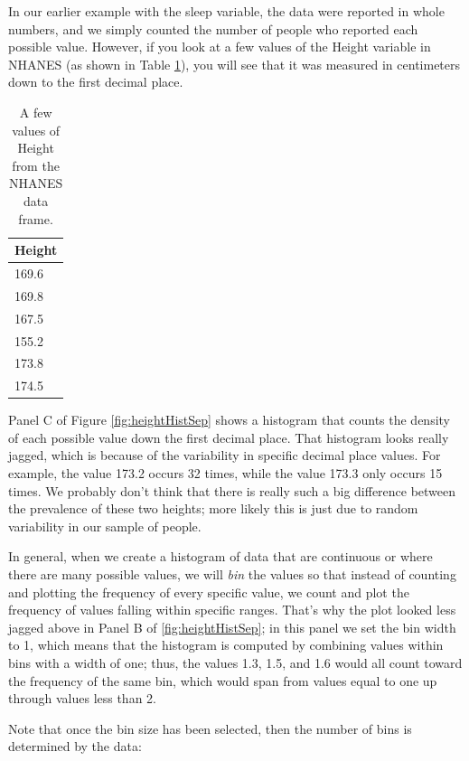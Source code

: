 \documentclass[
  12pt,
]{book}
\begin{document}
In our earlier example with the sleep variable, the data were reported in whole numbers, and we simply counted the number of people who reported each possible value. However, if you look at a few values of the Height variable in NHANES (as shown in Table \ref{tab:heightVals}), you will see that it was measured in centimeters down to the first decimal place.

\begin{table}

\caption{\label{tab:heightVals}A few values of Height from the NHANES data frame.}
\centering
\begin{tabular}[t]{l}
\hline
Height\\
\hline
169.6\\
\hline
169.8\\
\hline
167.5\\
\hline
155.2\\
\hline
173.8\\
\hline
174.5\\
\hline
\end{tabular}
\end{table}

Panel C of Figure \ref{fig:heightHistSep} shows a histogram that counts the density of each possible value down the first decimal place. That histogram looks really jagged, which is because of the variability in specific decimal place values. For example, the value 173.2 occurs 32 times, while the value 173.3 only occurs 15 times. We probably don't think that there is really such a big difference between the prevalence of these two heights; more likely this is just due to random variability in our sample of people.

In general, when we create a histogram of data that are continuous or where there are many possible values, we will \emph{bin} the values so that instead of counting and plotting the frequency of every specific value, we count and plot the frequency of values falling within specific ranges. That's why the plot looked less jagged above in Panel B of \ref{fig:heightHistSep}; in this panel we set the bin width to 1, which means that the histogram is computed by combining values within bins with a width of one; thus, the values 1.3, 1.5, and 1.6 would all count toward the frequency of the same bin, which would span from values equal to one up through values less than 2.

Note that once the bin size has been selected, then the number of bins is determined by the data:
\end{document}
